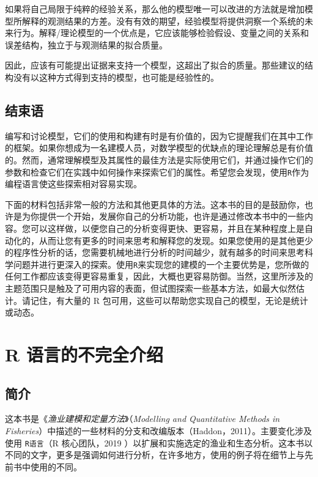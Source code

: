 \documentclass[
  lang=cn,
  11pt,
  scheme=chinese,
  chinesefont=nofont,
  citestyle=gb7714-2015,
  bibstyle=gb7714-2015]{elegantbook}
\begin{document}
如果将自己局限于纯粹的经验关系，那么他的模型唯一可以改进的方法就是增加模型所解释的观测结果的方差。没有有效的期望，经验模型将提供洞察一个系统的未来行为。解释/理论模型的一个优点是，它应该能够检验假设、变量之间的关系和误差结构，独立于与观测结果的拟合质量。

因此，应该有可能提出证据来支持一个模型，这超出了拟合的质量。那些建议的结构没有以这种方式得到支持的模型，也可能是经验性的。

\section{结束语}\label{ux7ed3ux675fux8bed}

编写和讨论模型，它们的使用和构建有时是有价值的，因为它提醒我们在其中工作的框架。如果你想成为一名建模人员，对数学模型的优缺点的理论理解总是有价值的。然而，通常理解模型及其属性的最佳方法是实际使用它们，并通过操作它们的参数和检查它们在实践中如何操作来探索它们的属性。希望您会发现，使用\texttt{R}作为编程语言使这些探索相对容易实现。

下面的材料包括非常一般的方法和其他更具体的方法。这本书的目的是鼓励你，也许是为你提供一个开始，发展你自己的分析功能，也许是通过修改本书中的一些内容。您可以这样做，以便您自己的分析变得更快、更容易，并且在某种程度上是自动化的，从而让您有更多的时间来思考和解释您的发现。如果您使用的是其他更少的程序性分析的话，您需要机械地进行分析的时间越少，就有越多的时间来思考科学问题并进行更深入的探索。使用\texttt{R}来实现您的建模的一个主要优势是，您所做的任何工作都应该变得更容易重复，因此，大概也更容易防御。当然，这里所涉及的主题范围只是触及了可用内容的表面，但试图探索一些基本方法，如最大似然估计。请记住，有大量的 R 包可用，这些可以帮助您实现自己的模型，无论是统计或动态。

\chapter{R 语言的不完全介绍}\label{sec-nonintroduction}

\section{简介}\label{ux7b80ux4ecb-1}

这本书是《\emph{渔业建模和定量方法}》（\emph{Modelling and Quantitative Methods in Fisheries}）中描述的一些材料的分支和改编版本（Haddon，2011）。主要变化涉及使用 \texttt{R语言}（R 核心团队，2019 ）以扩展和实施选定的渔业和生态分析。这本书以不同的文字，更多是强调如何进行分析，在许多地方，使用的例子将在细节上与先前书中使用的不同。
\end{document}

